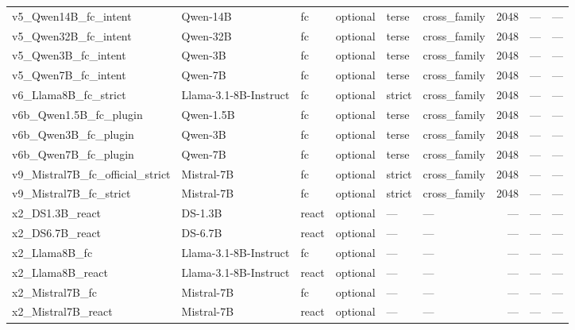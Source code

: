 {\begin{longtable}[]{@{}llllllrrr@{}}
v5\_Qwen14B\_fc\_intent & Qwen-14B & fc & optional & terse & cross\_family & 2048 & --- & --- \\
v5\_Qwen32B\_fc\_intent & Qwen-32B & fc & optional & terse & cross\_family & 2048 & --- & --- \\
v5\_Qwen3B\_fc\_intent & Qwen-3B & fc & optional & terse & cross\_family & 2048 & --- & --- \\
v5\_Qwen7B\_fc\_intent & Qwen-7B & fc & optional & terse & cross\_family & 2048 & --- & --- \\
v6\_Llama8B\_fc\_strict & Llama-3.1-8B-Instruct & fc & optional & strict & cross\_family & 2048 & --- & --- \\
v6b\_Qwen1.5B\_fc\_plugin & Qwen-1.5B & fc & optional & terse & cross\_family & 2048 & --- & --- \\
v6b\_Qwen3B\_fc\_plugin & Qwen-3B & fc & optional & terse & cross\_family & 2048 & --- & --- \\
v6b\_Qwen7B\_fc\_plugin & Qwen-7B & fc & optional & terse & cross\_family & 2048 & --- & --- \\
v9\_Mistral7B\_fc\_official\_strict & Mistral-7B & fc & optional & strict & cross\_family & 2048 & --- & --- \\
v9\_Mistral7B\_fc\_strict & Mistral-7B & fc & optional & strict & cross\_family & 2048 & --- & --- \\
x2\_DS1.3B\_react & DS-1.3B & react & optional & --- & --- & --- & --- & --- \\
x2\_DS6.7B\_react & DS-6.7B & react & optional & --- & --- & --- & --- & --- \\
x2\_Llama8B\_fc & Llama-3.1-8B-Instruct & fc & optional & --- & --- & --- & --- & --- \\
x2\_Llama8B\_react & Llama-3.1-8B-Instruct & react & optional & --- & --- & --- & --- & --- \\
x2\_Mistral7B\_fc & Mistral-7B & fc & optional & --- & --- & --- & --- & --- \\
x2\_Mistral7B\_react & Mistral-7B & react & optional & --- & --- & --- & --- & --- \\
\bottomrule
\end{longtable}
}
